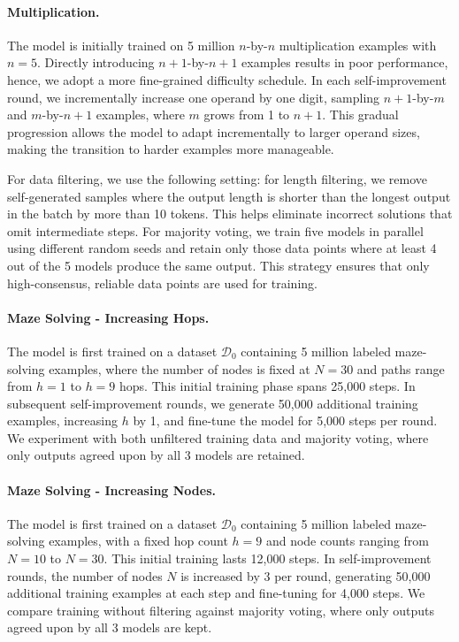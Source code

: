 \paragraph{Multiplication.}
The model is initially trained on 5 million  $n$-by-$n$ multiplication examples with $n=5$. Directly introducing $n+1$-by-$n+1$ examples results in poor performance, hence, we adopt a more fine-grained difficulty schedule. In each self-improvement round, we incrementally increase one operand by one digit, sampling $n+1$-by-$m$ and $m$-by-$n+1$ examples, where $m$ grows from 1 to $n+1$. This gradual progression allows the model to adapt incrementally to larger operand sizes, making the transition to harder examples more manageable.

For data filtering, we use the following setting:
for length filtering, we remove self-generated samples where the output length is shorter than the longest output in the batch by more than 10 tokens. This helps eliminate incorrect solutions that omit intermediate steps. For majority voting, we train five models in parallel using different random seeds and retain only those data points where at least 4 out of the 5 models produce the same output. This strategy ensures that only high-consensus, reliable data points are used for training.



\paragraph{Maze Solving - Increasing Hops.}
The model is first trained on a dataset \( \mathcal{D}_0 \) containing 5 million labeled maze-solving examples, where the number of nodes is fixed at \( N=30 \) and paths range from \( h=1 \) to \( h=9 \) hops. This initial training phase spans 25,000 steps. In subsequent self-improvement rounds, we generate 50,000 additional training examples, increasing \( h \) by 1, and fine-tune the model for 5,000 steps per round. We experiment with both unfiltered training data and majority voting, where only outputs agreed upon by all 3 models are retained.

\paragraph{Maze Solving - Increasing Nodes.}
The model is first trained on a dataset \( \mathcal{D}_0 \) containing 5 million labeled maze-solving examples, with a fixed hop count \( h=9 \) and node counts ranging from \( N=10 \) to \( N=30 \). This initial training lasts 12,000 steps. In self-improvement rounds, the number of nodes \( N \) is increased by 3 per round, generating 50,000 additional training examples at each step and fine-tuning for 4,000 steps. We compare training without filtering against majority voting, where only outputs agreed upon by all 3 models are kept.

